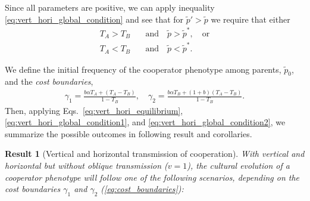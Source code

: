 \documentclass[12pt]{extarticle}
\newtheorem{result}{Result}
\begin{document}
{Since all parameters are positive, we can apply
inequality \ref{eq:vert_hori_global_condition} and see that for $\tilde{p}'>\tilde{p}$ we require that either 
\begin{align} 
\label{eq:vert_hori_global_condition1}
T_A > T_B \quad&\text{and}\quad \tilde{p}>\tilde{p}^*,  \quad \text{or} \\
\label{eq:vert_hori_global_condition2}
T_A <T_B \quad&\text{and}\quad \tilde{p}<\tilde{p}^* .
\end{align}

We define the initial frequency of the cooperator phenotype among parents, $\tilde{p}_0$, and the \emph{cost boundaries},
\begin{equation} \label{eq:cost_boundaries}
\begin{aligned}
\gamma_1 = \frac{b \alpha T_A + (T_A - T_B)}{1-T_B}, \quad
\gamma_2 = \frac{b \alpha T_B + (1+b) (T_A - T_B)}{1-T_B}.
\end{aligned}
\end{equation}
Then, applying Eqs.~\ref{eq:vert_hori_equilibrium}, \ref{eq:vert_hori_global_condition1}, and \ref{eq:vert_hori_global_condition2}, we  summarize the possible outcomes in following result and corollaries.
\\

\begin{result}[Vertical and horizontal transmission of cooperation] \label{result:vert_hori}
With vertical and horizontal but without oblique transmission ($v=1$), the cultural evolution of a cooperator phenotype will follow one of the following scenarios, depending on the cost boundaries $\gamma_1$ and $\gamma_2$ (\autoref{eq:cost_boundaries}):


\end{result}}
\end{document}

